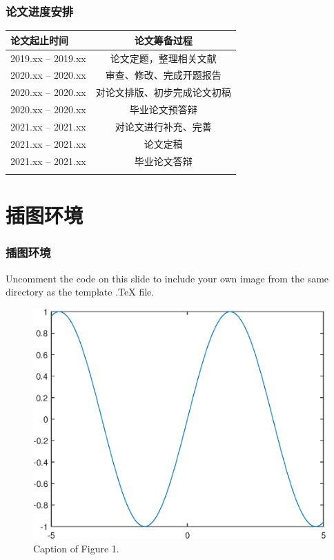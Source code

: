 \documentclass[notheorems,11pt,compress]{beamer}
\numberwithin{figure}{section}
\numberwithin{table}{section}
\numberwithin{equation}{section}
\numberwithin{theorem}{section}
\numberwithin{definition}{section}
\numberwithin{lemma}{section}
\numberwithin{proposition}{section}
\numberwithin{corollary}{section}
\theoremstyle{example}
\begin{document}

\begin{frame}
\frametitle{论文进度安排}
\begin{table}[htp!]
\centering
\renewcommand\arraystretch{1.3} %
\begin{tabularx}{0.92\textwidth}{|P{3.2cm}|C|}
\Xhline{2\arrayrulewidth}
论文起止时间       &  论文筹备过程\\
\hline
2019.xx -- 2019.xx    &  论文定题，整理相关文献\\
\hline
2020.xx -- 2020.xx    &  审查、修改、完成开题报告\\
\hline
2020.xx -- 2020.xx   &  对论文排版、初步完成论文初稿\\
\hline
2020.xx -- 2020.xx    &  毕业论文预答辩\\
\hline
2021.xx -- 2021.xx    &  对论文进行补充、完善\\
\hline
2021.xx -- 2021.xx    &  论文定稿\\
\hline
2021.xx -- 2021.xx    &  毕业论文答辩\\
\Xhline{2\arrayrulewidth}
\end{tabularx}
\end{table}

\end{frame}



\section{插图环境}

\begin{frame}
\frametitle{插图环境}

Uncomment the code on this slide to include your own image from the same directory as the template .TeX file.
\begin{figure}[htp!]
\centering
\includegraphics[width=0.5\linewidth]{image1}
\caption{Caption of Figure 1.} \label{fig:A}
\end{figure}
\end{frame}
\end{document}
